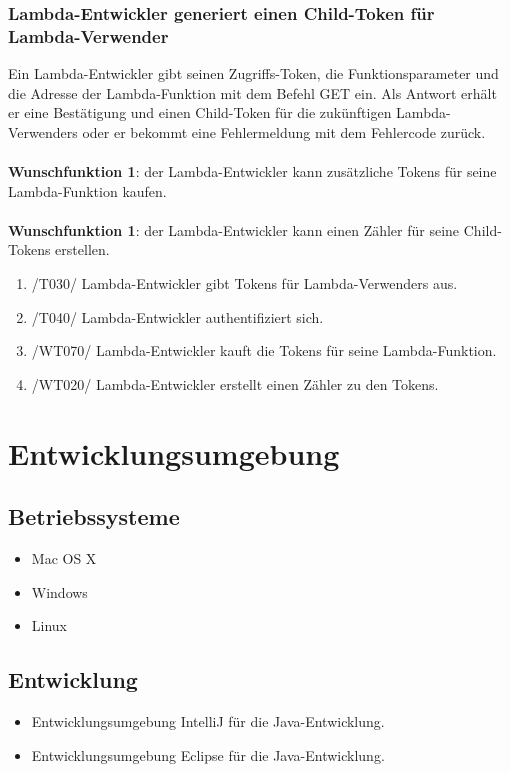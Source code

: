 \documentclass[a4paper,20pt,oneside]{book}
\begin{document}
\subsection{\gls{Lambda-Entwickler} generiert einen Child-Token für \gls{Lambda-Verwender}}
Ein \Gls{Lambda-Entwickler} gibt seinen Zugriffs-\gls{Token}, die Funktionsparameter und die Adresse der \gls{Lambda-Funktion} mit dem Befehl GET ein. Als Antwort erhält er eine Bestätigung und einen Child-Token für die zukünftigen \Glspl{Lambda-Verwender} oder er bekommt eine Fehlermeldung mit dem Fehlercode zurück.\\\\
\textbf{Wunschfunktion 1}: der \Gls{Lambda-Entwickler} kann zusätzliche \glspl{Token} für seine \gls{Lambda-Funktion} kaufen.\\\\
\textbf{Wunschfunktion 1}: der \Gls{Lambda-Entwickler} kann einen Zähler für seine Child-Tokens erstellen.\\
\begin{enumerate}
\item /T030/ \Gls{Lambda-Entwickler} gibt \glspl{Token} für \Glspl{Lambda-Verwender} aus.
\item /T040/ \Gls{Lambda-Entwickler} authentifiziert sich. 
\item /WT070/ \Gls{Lambda-Entwickler} kauft die \glspl{Token} für seine \gls{Lambda-Funktion}.
\item /WT020/ \Gls{Lambda-Entwickler} erstellt einen Zähler zu den \glspl{Token}.
\\
\end{enumerate} 
\chapter{Entwicklungsumgebung}
\section{Betriebssysteme}
\begin{itemize}
\item Mac OS X
\item Windows
\item Linux
\end{itemize}

\section{Entwicklung}
\begin{itemize}
\item Entwicklungsumgebung \Gls{IntelliJ} für die Java-Entwicklung. 
\item  Entwicklungsumgebung \Gls{Eclipse} für die Java-Entwicklung.
\end{itemize}
\end{document}
